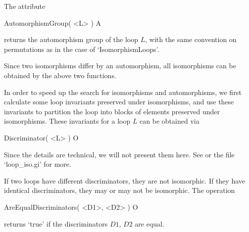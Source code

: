 The attribute

\>AutomorphismGroup( <L> ) A

returns the automorphism group of the loop $L$, with the same convention on
permutations as in the case of `IsomorphismLoops'.

Since two isomorphisms differ by an automorphism, all isomorphisms can be
obtained by the above two functions.


In order to speed up the search for isomorphisms and automorphisms, we first
calculate some loop invariants preserved under isomorphisms, and use these
invariants to partition the loop into blocks of elements preserved under
isomorphisms. These invariants for a loop $L$ can be obtained via

\>Discriminator( <L> ) O

Since the details are technical, we will not present them here. See
\cite{VoEJC} or the file `loop_iso.gi' for more.

If two loops have different discriminators, they are not isomorphic. If they
have identical discriminators, they may or may not be isomorphic. The operation

\>AreEqualDiscriminators( <D1>, <D2> ) O

returns `true' if the discriminators $D1$, $D2$ are equal.
